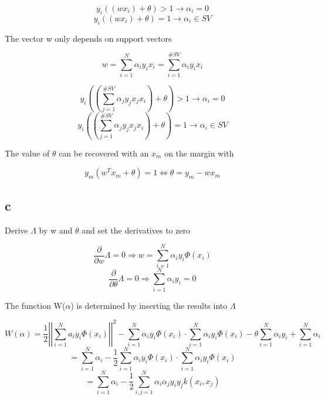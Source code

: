 \documentclass[11pt,abstract=on]{scrartcl}
\begin{document}
\begin{equation*}
y_i((w x_i) + \theta) > 1 \rightarrow \alpha_i = 0
\end{equation*}
\begin{equation*}
y_i((w x_i) + \theta) = 1 \rightarrow \alpha_i \in SV
\end{equation*}

The vector w only depends on support vectors

\begin{equation*}
w = \sum\limits_{i=1}^{N} \alpha_i y_i x_i = \sum\limits_{i=1}^{\#SV} \alpha_i y_i x_i
\end{equation*}

\begin{equation*}
y_i((\sum\limits_{j=1}^{\#SV} \alpha_j y_j x_j x_i) + \theta) > 1 \rightarrow \alpha_i = 0
\end{equation*}
\begin{equation*}
y_i((\sum\limits_{j=1}^{\#SV} \alpha_j y_j x_j x_i) + \theta) = 1 \rightarrow \alpha_i \in SV
\end{equation*}

The value of $\theta$ can be recovered with an $x_m$ on the margin with

\begin{equation*}
y_m (w^T x_m + \theta) = 1 \Leftrightarrow \theta = y_m - w x_m
\end{equation*}

\subsection{c}

Derive $\Lambda$ by w and $\theta$ and set the derivatives to zero

\begin{equation*}
\frac{\partial}{\partial w} \Lambda = 0 \Rightarrow w = \sum\limits_{i=1}^{N}\alpha_i y_i \Phi(x_i)
\end{equation*}
\begin{equation*}
 \frac{\partial}{\partial \theta} \Lambda = 0 \Rightarrow \sum\limits_{i=1}^{N}\alpha_i y_i = 0
\end{equation*}

The function W($\alpha$) is determined by inserting the results into $\Lambda$

\begin{equation*}
W(\alpha) = \frac{1}{2}\left|\left|\sum\limits_{i=1}^{N}a_i y_i \Phi(x_i) \right|\right|^2 - \sum\limits_{i=1}^{N} \alpha_i y_i \Phi(x_i) \cdot \sum\limits_{i=1}^{N} \alpha_i y_i \Phi(x_i) - \theta \sum\limits_{i=1}^{N} \alpha_i y_i + \sum\limits_{i=1}^{N} \alpha_i
\end{equation*}
\begin{equation*}
= \sum\limits_{i=1}^{N} \alpha_i-\frac{1}{2} \sum\limits_{i=1}^{N} \alpha_i y_i \Phi(x_i) \cdot \sum\limits_{i=1}^{N} \alpha_i y_i \Phi(x_i)
\end{equation*}
\begin{equation*}
= \sum\limits_{i=1}^{N} \alpha_i-\frac{1}{2} \sum\limits_{i,j=1}^{N} \alpha_i \alpha_j y_i y_j k(x_i, x_j)
\end{equation*}
\end{document}
